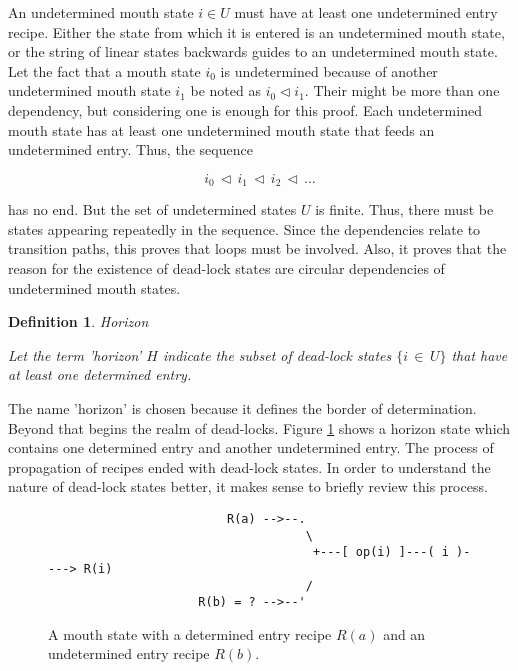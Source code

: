 \documentclass[12pt,a4paper]{scrartcl}
\newtheorem{definition}{Definition}
\begin{document}
An undetermined mouth state $i \in U$ must have at least one undetermined entry
recipe. Either the state from which it is entered is an undetermined mouth state, 
or the string of linear states backwards guides to an undetermined mouth state. 
Let the fact that a mouth state $i_0$ is undetermined because of another
undetermined mouth state $i_1$ be noted as $i_0 \vartriangleleft i_1$. Their might
be more than one dependency, but considering one is enough for this proof. Each
undetermined mouth state has at least one undetermined mouth state that feeds
an undetermined entry. Thus, the sequence 

\begin{equation}
    i_0\,\vartriangleleft\,i_1\,\vartriangleleft\,i_2\,\vartriangleleft\,\ldots
\end{equation}

has no end. But the set of undetermined states $U$ is finite. Thus, there must
be states appearing repeatedly in the sequence. Since the dependencies relate to
transition paths, this proves that loops must be involved. Also, it proves that
the reason for the existence of dead-lock states are circular dependencies of
undetermined mouth states.

\begin{definition}
Horizon

Let the term 'horizon' $H$ indicate the subset of dead-lock states $\{
i\,\in\,U \}$ that have at least one determined entry.  
\end{definition}

The name 'horizon' is chosen because it defines the border of determination.
Beyond that begins the realm of dead-locks. Figure \ref{fig:horizon-state}
shows a horizon state which contains one determined entry and another
undetermined entry.  The process of propagation of recipes ended with dead-lock
states. In order to understand the nature of dead-lock states better, it makes
sense to briefly review this process. 

\begin{figure}[htbp] \leavevmode \label{fig:horizon-state}
\begin{verbatim}
                         R(a) -->--.
                                    \
                                     +---[ op(i) ]---( i )----> R(i)
                                    /
                     R(b) = ? -->--'

\end{verbatim}
\caption{A mouth state with a determined entry recipe $R(a)$ and 
an undetermined entry recipe $R(b)$.}
\end{figure}
\end{document}
